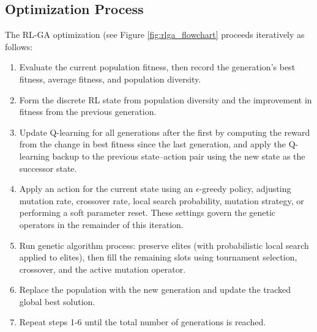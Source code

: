 \documentclass{article}
\begin{document}
\subsection{Optimization Process}
The RL-GA optimization (see Figure \ref{fig:rlga_flowchart} proceeds iteratively as follows:
\begin{enumerate}
    \item Evaluate the current population fitness, then record the generation's best fitness, average fitness, and population diversity.
    \item Form the discrete RL state from population diversity and the improvement in fitness from the previous generation.
    \item Update Q-learning for all generations after the first by computing the reward from the change in best fitness since the last generation, and apply the Q-learning backup to the previous state--action pair using the new state as the successor state.
    \item Apply an action for the current state using an $\epsilon$-greedy policy, adjusting mutation rate, crossover rate, local search probability, mutation strategy, or performing a soft parameter reset. These settings govern the genetic operators in the remainder of this iteration.
    \item Run genetic algorithm process: preserve elites (with probabilistic local search applied to elites), then fill the remaining slots using tournament selection, crossover, and the active mutation operator.
    \item Replace the population with the new generation and update the tracked global best solution.
    \item Repeat steps 1-6 until the total number of generations is reached.
\end{enumerate}
\end{document}
